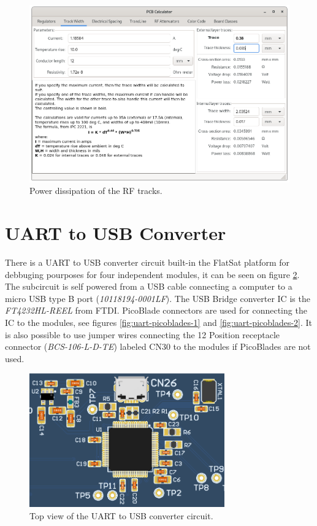 \begin{figure}[!ht]
    \begin{center}
        \includegraphics[width=\textwidth]{figures/rf-track-width-power.png}
        \caption{Power dissipation of the RF tracks.}
        \label{fig:rf-track-width-power-calc}
    \end{center}
\end{figure}

\section{UART to USB Converter}

There is a UART to USB converter circuit built-in the FlatSat platform for debbuging pourposes for four independent modules, it can be seen on figure \ref{fig:ft4232h-circuit}. The subcircuit is self powered from a USB cable connecting a computer to a micro USB type B port (\textit{10118194-0001LF}). The    
USB Bridge converter IC is the \textit{FT4232HL-REEL} from FTDI. PicoBlade connectors are used for connecting the IC to the modules, see figures \ref{fig:uart-picoblades-1} and \ref{fig:uart-picoblades-2}. It is also possible to use jumper wires connecting the 12 Position receptacle connector (\textit{BCS-106-L-D-TE}) labeled CN30 to the modules if PicoBlades are not used.

\begin{figure}[!ht]
    \begin{center}
        \includegraphics[width=0.75\textwidth]{figures/ft4232h_circuit.png}
        \caption{Top view of the UART to USB converter circuit.}
        \label{fig:ft4232h-circuit}
    \end{center}
\end{figure}

